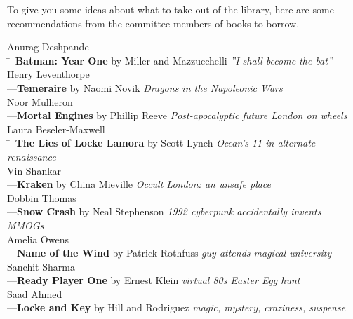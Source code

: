 To give you some ideas about what to take out of the library, here are some recommendations from the committee members of books to borrow. 

\par\vspace{-1em}
\parbox{0.4\textwidth}{
\begin{tabbing}
Anurag Deshpande\\ \quad\=---\quad \textbf{Batman: Year One} by Miller and Mazzucchelli \textit{''I shall become the bat''}\\
Henry Leventhorpe \\ \>---\quad \textbf{Temeraire} by Naomi Novik \textit{Dragons in the Napoleonic Wars}\\
Noor Mulheron\\ \>---\quad \textbf{Mortal Engines} by Phillip Reeve \textit{Post-apocalyptic future London on wheels}\\
Laura Beseler-Maxwell\\ \quad\=---\quad \textbf{The Lies of Locke Lamora} by Scott Lynch \textit{Ocean's 11 in alternate renaissance}\\
Vin Shankar \\ \>---\quad \textbf{Kraken} by China Mieville \textit{Occult London: an unsafe place}\\
Dobbin Thomas\\ \>---\quad \textbf{Snow Crash} by Neal Stephenson \textit{1992 cyberpunk accidentally invents MMOGs}\\
Amelia Owens\\ \>---\quad \textbf{Name of the Wind} by Patrick Rothfuss \textit{guy attends magical university}\\
Sanchit Sharma\\ \>---\quad \textbf{Ready Player One} by Ernest Klein \textit{virtual 80s Easter Egg hunt}\\
Saad Ahmed\\ \>---\quad \textbf{Locke and Key} by Hill and Rodriguez \textit{magic, mystery, craziness, suspense}\\
\end{tabbing}
}
